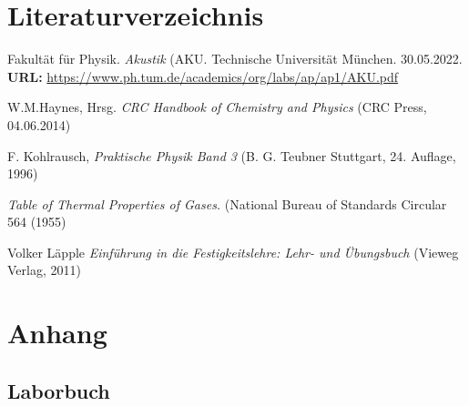 \documentclass{article}
\begin{document}
\section{Literaturverzeichnis}
\begin{thebibliography}{9}
Fakultät für Physik. \emph{Akustik} (AKU. Technische Universität München. 30.05.2022.
\textbf{URL:} \url{https://www.ph.tum.de/academics/org/labs/ap/ap1/AKU.pdf}

W.M.Haynes, Hrsg. \emph{CRC Handbook of Chemistry and Physics} (CRC Press, 04.06.2014)

F. Kohlrausch, \emph{Praktische Physik Band 3} (B. G. Teubner Stuttgart, 24. Auflage, 1996)

\emph{Table of Thermal Properties of Gases.} (National Bureau of Standards Circular 564 (1955)

Volker Läpple \emph{Einführung in die Festigkeitslehre: Lehr- und Übungsbuch} (Vieweg Verlag, 2011)

\end{thebibliography}
\section{Anhang}
\subsection{Laborbuch}

\end{document}
